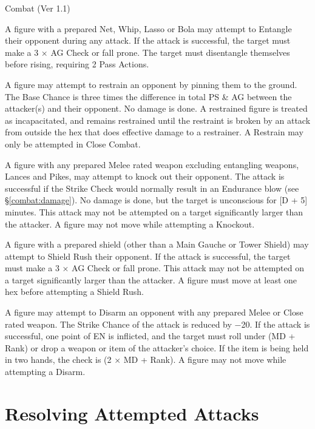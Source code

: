 \begin{Chapter}{Combat (Ver 1.1)}
\begin{Description}
\item[Entangle] A figure with a prepared Net, Whip, Lasso or Bola may
  attempt to Entangle their opponent during any attack.  If the attack
  is successful, the target must make a 3 × AG Check or fall prone.
  The target must disentangle themselves before rising, requiring 2
  Pass Actions.

\item[Restrain] A figure may attempt to restrain an opponent by
  pinning them to the ground.  The Base Chance is three times the
  difference in total PS \& AG between the attacker(s) and their
  opponent. No damage is done.  A restrained figure is treated as
  incapacitated, and remains restrained until the restraint is broken
  by an attack from outside the hex that does effective damage to a
  restrainer.  A Restrain may only be attempted in Close Combat.

\item[Knockout] A figure with any prepared Melee rated weapon
  excluding entangling weapons, Lances and Pikes, may attempt to knock
  out their opponent.  The attack is successful if the Strike Check
  would normally result in an Endurance blow (see
  \S\ref{combat:damage}).  No damage is done, but the target is
  unconscious for [D + 5] minutes.  This attack may not be attempted
  on a target significantly larger than the attacker.  A figure may
  not move while attempting a Knockout.

\item[Shield Rush] A figure with a prepared shield (other than a Main
  Gauche or Tower Shield) may attempt to Shield Rush their
  opponent. If the attack is successful, the target must make a 3 × AG
  Check or fall prone.  This attack may not be attempted on a target
  significantly larger than the attacker.  A figure must move at least
  one hex before attempting a Shield Rush.

\item[Disarm] A figure may attempt to Disarm an opponent with any
  prepared Melee or Close rated weapon. The Strike Chance of the
  attack is reduced by −20. If the attack is successful, one point of
  EN is inflicted, and the target must roll under (MD + Rank) or drop
  a weapon or item of the attacker’s choice.  If the item is being
  held in two hands, the check is (2 × MD + Rank). A figure may not
  move while attempting a Disarm.

\end{Description}

\section{Resolving Attempted Attacks}
\label{combat:resolving}


\end{Chapter}
